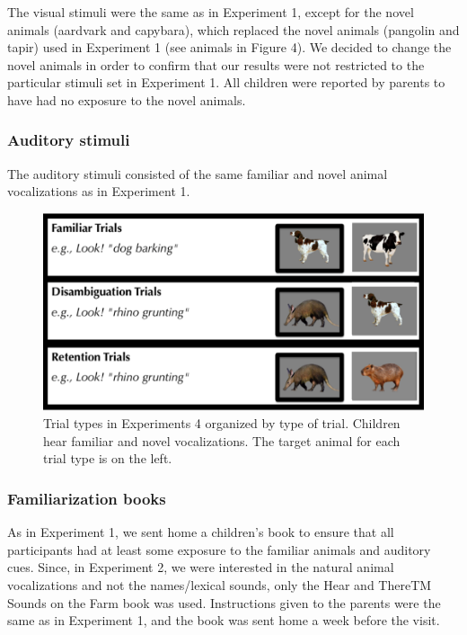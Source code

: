\documentclass[english,floatsintext,man]{apa6}
\theoremstyle{definition}
\theoremstyle{definition}
\theoremstyle{definition}
\theoremstyle{remark}
\begin{document}
The visual stimuli were the same as in Experiment 1, except for the
novel animals (aardvark and capybara), which replaced the novel animals
(pangolin and tapir) used in Experiment 1 (see animals in Figure 4). We
decided to change the novel animals in order to confirm that our results
were not restricted to the particular stimuli set in Experiment 1. All
children were reported by parents to have had no exposure to the novel
animals.

\subsubsection{Auditory stimuli}\label{auditory-stimuli-1}

The auditory stimuli consisted of the same familiar and novel animal
vocalizations as in Experiment 1.

\begin{figure}[tb]
\includegraphics[width=0.95\linewidth]{anime_manuscript_files/figure-latex/stimuli-e2-1} \caption{Trial types in Experiments 4 organized by type of trial. Children hear familiar and novel vocalizations. The target animal for each trial type is on the left.}\label{fig:stimuli-e2}
\end{figure}

\subsubsection{Familiarization books}\label{familiarization-books-1}

As in Experiment 1, we sent home a children's book to ensure that all
participants had at least some exposure to the familiar animals and
auditory cues. Since, in Experiment 2, we were interested in the natural
animal vocalizations and not the names/lexical sounds, only the Hear and
ThereTM Sounds on the Farm book was used. Instructions given to the
parents were the same as in Experiment 1, and the book was sent home a
week before the visit.
\end{document}
